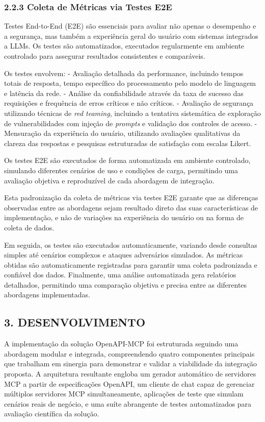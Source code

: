 \documentclass[
]{article}
\begin{document}
\subsubsection{2.2.3 Coleta de Métricas via Testes
E2E}\label{coleta-de-muxe9tricas-via-testes-e2e}

Testes End-to-End (E2E) são essenciais para avaliar não apenas o
desempenho e a segurança, mas também a experiência geral do usuário com
sistemas integrados a LLMs. Os testes são automatizados, executados
regularmente em ambiente controlado para assegurar resultados
consistentes e comparáveis.

Os testes envolvem: - Avaliação detalhada da performance, incluindo
tempos totais de resposta, tempo específico do processamento pelo modelo
de linguagem e latência da rede. - Análise da confiabilidade através da
taxa de sucesso das requisições e frequência de erros críticos e não
críticos. - Avaliação de segurança utilizando técnicas de \emph{red
teaming}, incluindo a tentativa sistemática de exploração de
vulnerabilidades com injeção de \emph{prompts} e validação dos controles
de acesso. - Mensuração da experiência do usuário, utilizando avaliações
qualitativas da clareza das respostas e pesquisas estruturadas de
satisfação com escalas Likert.

Os testes E2E são executados de forma automatizada em ambiente
controlado, simulando diferentes cenários de uso e condições de carga,
permitindo uma avaliação objetiva e reproduzível de cada abordagem de
integração.

Esta padronização da coleta de métricas via testes E2E garante que as
diferenças observadas entre as abordagens sejam resultado direto das
suas características de implementação, e não de variações na experiência
do usuário ou na forma de coleta de dados.

Em seguida, os testes são executados automaticamente, variando desde
consultas simples até cenários complexos e ataques adversários
simulados. As métricas obtidas são automaticamente registradas para
garantir uma coleta padronizada e confiável dos dados. Finalmente, uma
análise automatizada gera relatórios detalhados, permitindo uma
comparação objetiva e precisa entre as diferentes abordagens
implementadas.

\subsection{3. DESENVOLVIMENTO}\label{desenvolvimento}

A implementação da solução OpenAPI-MCP foi estruturada seguindo uma
abordagem modular e integrada, compreendendo quatro componentes
principais que trabalham em sinergia para demonstrar e validar a
viabilidade da integração proposta. A arquitetura resultante engloba um
gerador automático de servidores MCP a partir de especificações OpenAPI,
um cliente de chat capaz de gerenciar múltiplos servidores MCP
simultaneamente, aplicações de teste que simulam cenários reais de
negócio, e uma suíte abrangente de testes automatizados para avaliação
científica da solução.
\end{document}
